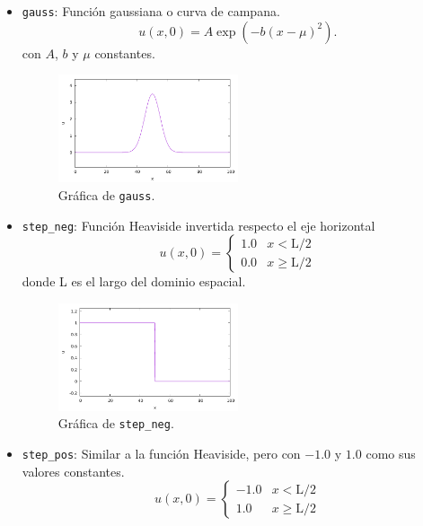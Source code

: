 \documentclass[12pt]{article}
\begin{document}
	\begin{itemize}
		\item \texttt{gauss}: Función gaussiana o curva de campana.
		\begin{equation}
			u(x,0) = A\exp(-b(x-\mu)^{2}).
		\end{equation}
		con $A$, $b$ y $\mu$ constantes.
		\begin{figure}[ht]
			\centering
			\includegraphics[width=0.5\textwidth]{../burgers1DVF/results/graficas_iniciales/gauss.pdf}
			\caption*{Gráfica de \texttt{gauss}.}
		\end{figure}
		\item \texttt{step\_neg}: Función Heaviside invertida respecto el eje horizontal
		\begin{equation}
			u(x,0) = 
			\begin{cases}
				1.0 & x < \text{L}/2\\
				0.0 & x \geq \text{L}/2
			\end{cases}
		\end{equation}
		donde L es el largo del dominio espacial.
		\begin{figure}[ht]
			\centering
			\includegraphics[width=0.5\textwidth]{../burgers1DVF/results/graficas_iniciales/step_neg.pdf}
			\caption*{Gráfica de \texttt{step\_neg}.}
		\end{figure}
		\item \texttt{step\_pos}: Similar a la función Heaviside, pero con $-1.0$ y $1.0$ como sus valores constantes.
		\begin{equation}
			u(x,0) = 
			\begin{cases}
				-1.0 & x < \text{L}/2\\
				1.0 & x \geq \text{L}/2

\end{cases}
\end{equation}
\end{itemize}
\end{document}
